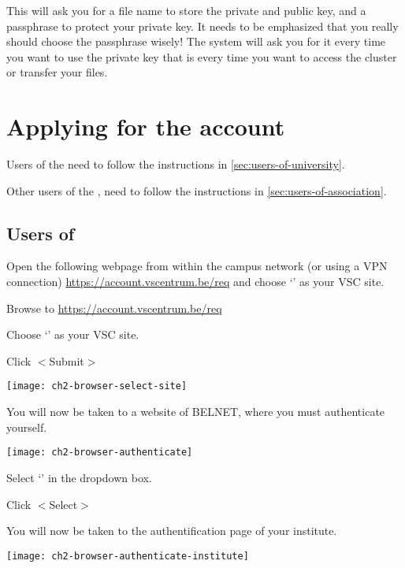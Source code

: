   This will ask you for a file name to store the private and public key, and a
  passphrase to protect your private key. It needs to be emphasized that you
  really should choose the passphrase wisely! The system will ask you for it
  every time you want to use the private key that is every time you want to
  access the cluster or transfer your files.

\fi %

\section{Applying for the account}
\label{sec:applying-for-the-account}

Users of the \university need to follow the instructions in \autoref{sec:users-of-university}.

Other users of the \association, need to follow the instructions in \autoref{sec:users-of-association}.

\subsection{Users of \university}
\label{sec:users-of-university}

Open the following webpage from within the \university campus network (or using a VPN
connection) \url{https://account.vscentrum.be/req} and choose `\sitename' as your VSC
site.

Browse to \url{https://account.vscentrum.be/req}

Choose `\sitename' as your VSC site.

Click $<$Submit$>$

\texttt{[image: ch2-browser-select-site]}

You will now be taken to a website of BELNET, where you must authenticate yourself.

\texttt{[image: ch2-browser-authenticate]}

Select `\university' in the dropdown box.

Click $<$Select$>$

You will now be taken to the authentification page of your institute.

\ifantwerpen
\texttt{[image: ch2-browser-authenticate-institute]}
\fi

